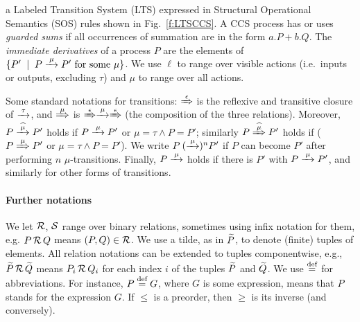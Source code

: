a Labeled Transition System (LTS) expressed in Structural Operational
Semantics (SOS) rules shown in Fig.~\ref{f:LTSCCS}.
A CCS process has or uses \emph{guarded sums} if all occurrences of
summation are in the form $a.P + b.Q$.
The \emph{immediate derivatives} of a
process $P$ are the elements of $\{P' \st P \arr\mu P'
\mbox{ for some $\mu$}\}$.
We use $\ell$ to range over visible actions (i.e.~inputs or outputs, excluding $\tau$)
and $\mu$ to range over all actions.

Some standard notations for transitions: $\Arr\epsilon$ is the 
reflexive and transitive closure of $\arr\tau$, and 
$\Arr \mu $ is $\Arr\epsilon \arr\mu \Arr\epsilon$ (the
composition of the three relations).
Moreover,   
$P \arcap \mu P'$ holds if $P \arr\mu P'$ or $\mu =\tau \wedge P = P'$; similarly 
$P \Arcap \mu P'$ holds if ($P \Arr\mu P'$ or $\mu =\tau \wedge P = P'$).
We write $P \:(\arr\mu)^n P'$ if $P$ can become $P'$ after performing
$n$ $\mu$-transitions. Finally, $P \arr\mu$ holds if there is $P'$
with $P \arr\mu P'$, and similarly for other forms of transitions.

\paragraph{Further notations}
We let $\R$, $\S$ range over binary relations, sometimes using 
 infix notation for them, e.g. $P \,\R\, Q$ means $(P,Q) \in \R$.
We use a tilde, as in  $\til P$, to denote (finite) tuples of elements. 
All relation notations can be extended to tuples componentwise,
e.g., $\til P \,\R\, \til Q$ means $P_i \,\R\, Q_i$ for each index $i$ of the tuples $\til P$ and $\til Q$.
We use $\DSdefi$ for abbreviations. For instance, $P \DSdefi G $, where
$G$ is some expression, means that $P$ stands for the expression $G$.
If $\leq$ is a preorder, then  $\geq$  is its inverse (and conversely).

